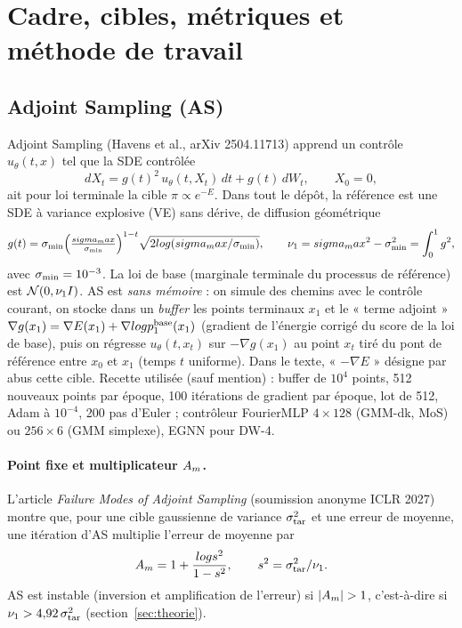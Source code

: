 \section{Cadre, cibles, métriques et méthode de travail}
\label{sec:cadre}

\subsection{Adjoint Sampling (AS)}
Adjoint Sampling (Havens et al., arXiv 2504.11713) apprend un contrôle $u_\theta(t,x)$ tel que la SDE contrôlée
\[
  dX_t = g(t)^2\,u_\theta(t,X_t)\,dt + g(t)\,dW_t,\qquad X_0=0,
\]
ait pour loi terminale la cible $\pi\propto e^{-E}$. Dans tout le dépôt, la référence est une SDE à variance explosive (VE) sans dérive, de diffusion géométrique
\[
  g(t)=\smin\Big(\tfrac{\smax}{\smin}\Big)^{1-t}\sqrt{2\log(\smax/\smin)},\qquad \nuone=\smax^2-\smin^2=\int_0^1 g^2,
\]
avec $\smin=10^{-3}$. La loi de base (marginale terminale du processus de référence) est $\N(0,\nuone I)$. AS est \emph{sans mémoire} : on simule des chemins avec le contrôle courant, on stocke dans un \emph{buffer} les points terminaux $x_1$ et le « terme adjoint » $\nabla g(x_1)=\nabla E(x_1)+\nabla\log p^{\rm base}_1(x_1)$ (gradient de l'énergie corrigé du score de la loi de base), puis on régresse $u_\theta(t,x_t)$ sur $-\nabla g(x_1)$ au point $x_t$ tiré du pont de référence entre $x_0$ et $x_1$ (temps $t$ uniforme). Dans le texte, « $-\nabla E$ » désigne par abus cette cible. Recette utilisée (sauf mention) : buffer de $10^4$ points, 512 nouveaux points par époque, 100 itérations de gradient par époque, lot de 512, Adam à $10^{-4}$, 200 pas d'Euler ; contrôleur FourierMLP $4\times128$ (GMM-dk, MoS) ou $256\times6$ (GMM simplexe), EGNN pour DW-4.

\paragraph{Point fixe et multiplicateur $\Am$.} L'article \emph{Failure Modes of Adjoint Sampling} (soumission anonyme ICLR 2027) montre que, pour une cible gaussienne de variance $\sigma_{\rm tar}^2$ et une erreur de moyenne, une itération d'AS multiplie l'erreur de moyenne par
\[
  \Am = 1+\frac{\log s^2}{1-s^2},\qquad s^2=\sigma_{\rm tar}^2/\nuone .
\]
AS est instable (inversion et amplification de l'erreur) si $|\Am|>1$, c'est-à-dire si $\nuone>4{,}92\,\sigma_{\rm tar}^2$ (section~\ref{sec:theorie}).

